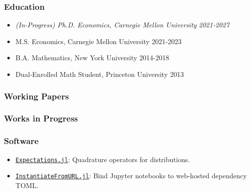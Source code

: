 \documentclass[12pt]{article}   %
\begin{document}
\subsubsection*{Education}
\begin{itemize}
  \item \textit{(In-Progress) Ph.D. Economics, Carnegie Mellon University} \hfill \emph{2021-2027}
  \item M.S. Economics, Carnegie Mellon University \hfill 2021-2023
  \item B.A. Mathematics, New York University \hfill 2014-2018
  \item Dual-Enrolled Math Student, Princeton University \hfill 2013
\end{itemize} 


\subsubsection*{Working Papers}
\begin{refsection} %
\nocite{NBERw28981}
\hspace*{1.2cm}%
\begin{minipage}{0.9\textwidth}%
  \printbibliography[heading=none, sorting=ynt]
\end{minipage}%
\end{refsection}

\subsubsection*{Works in Progress}
\begin{refsection} %
\nocite{FP}
\hspace*{1.2cm}%
\begin{minipage}{0.9\textwidth}%
  \printbibliography[heading=none, sorting=ynt]
\end{minipage}%
\end{refsection}


\subsubsection*{Software}
\begin{itemize}
  \item \href{https://github.com/QuantEcon/Expectations.jl}{\texttt{Expectations.jl}}: Quadrature operators for distributions.
  \item \href{https://github.com/QuantEcon/InstantiateFromURL.jl}{\texttt{InstantiateFromURL.jl}}: Bind Jupyter notebooks to web-hosted dependency TOML.
\end{itemize}
\end{document}
